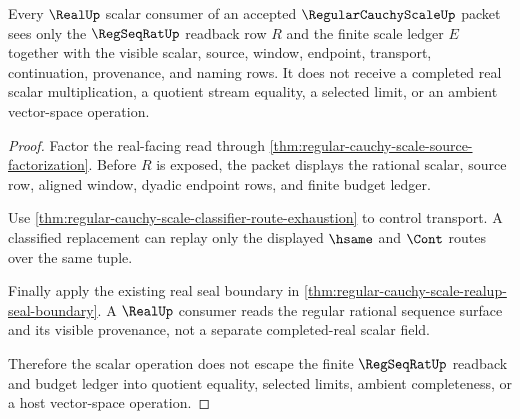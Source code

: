 \begin{theorem}
\label{thm:regular-cauchy-scale-real-scalar-non-escape}
Every $\RealUp$ scalar consumer of an accepted $\RegularCauchyScaleUp$ packet sees only the $\RegSeqRatUp$ readback row $R$ and the finite scale ledger $E$ together with the visible scalar, source, window, endpoint, transport, continuation, provenance, and naming rows. It does not receive a completed real scalar multiplication, a quotient stream equality, a selected limit, or an ambient vector-space operation.
\end{theorem}
\begin{proof}
Factor the real-facing read through \autoref{thm:regular-cauchy-scale-source-factorization}. Before $R$ is exposed, the packet displays the rational scalar, source row, aligned window, dyadic endpoint rows, and finite budget ledger.

Use \autoref{thm:regular-cauchy-scale-classifier-route-exhaustion} to control transport. A classified replacement can replay only the displayed $\hsame$ and $\Cont$ routes over the same tuple.

Finally apply the existing real seal boundary in \autoref{thm:regular-cauchy-scale-realup-seal-boundary}. A $\RealUp$ consumer reads the regular rational sequence surface and its visible provenance, not a separate completed-real scalar field.

Therefore the scalar operation does not escape the finite $\RegSeqRatUp$ readback and budget ledger into quotient equality, selected limits, ambient completeness, or a host vector-space operation.
\end{proof}

